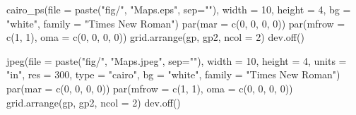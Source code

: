 \documentclass[
  letterpaper,
]{scrbook}
\newenvironment{Shaded}{\begin{snugshade}}{\end{snugshade}}
\newcommand{\AttributeTok}[1]{\textcolor[rgb]{0.40,0.45,0.13}{#1}}
\newcommand{\DecValTok}[1]{\textcolor[rgb]{0.68,0.00,0.00}{#1}}
\newcommand{\FunctionTok}[1]{\textcolor[rgb]{0.28,0.35,0.67}{#1}}
\newcommand{\NormalTok}[1]{\textcolor[rgb]{0.00,0.23,0.31}{#1}}
\newcommand{\StringTok}[1]{\textcolor[rgb]{0.13,0.47,0.30}{#1}}
\begin{document}
\begin{Shaded}
\begin{Highlighting}[]
\FunctionTok{cairo\_ps}\NormalTok{(}\AttributeTok{file =} \FunctionTok{paste}\NormalTok{(}\StringTok{"fig/"}\NormalTok{, }\StringTok{"Maps.eps"}\NormalTok{, }\AttributeTok{sep=}\StringTok{""}\NormalTok{), }\AttributeTok{width =} \DecValTok{10}\NormalTok{, }\AttributeTok{height =} \DecValTok{4}\NormalTok{, }
          \AttributeTok{bg =} \StringTok{"white"}\NormalTok{, }\AttributeTok{family =} \StringTok{"Times New Roman"}\NormalTok{)}
\FunctionTok{par}\NormalTok{(}\AttributeTok{mar =} \FunctionTok{c}\NormalTok{(}\DecValTok{0}\NormalTok{, }\DecValTok{0}\NormalTok{, }\DecValTok{0}\NormalTok{, }\DecValTok{0}\NormalTok{))}
\FunctionTok{par}\NormalTok{(}\AttributeTok{mfrow =} \FunctionTok{c}\NormalTok{(}\DecValTok{1}\NormalTok{, }\DecValTok{1}\NormalTok{), }\AttributeTok{oma =} \FunctionTok{c}\NormalTok{(}\DecValTok{0}\NormalTok{, }\DecValTok{0}\NormalTok{, }\DecValTok{0}\NormalTok{, }\DecValTok{0}\NormalTok{))}
\FunctionTok{grid.arrange}\NormalTok{(gp, gp2, }\AttributeTok{ncol =} \DecValTok{2}\NormalTok{)}
\FunctionTok{dev.off}\NormalTok{()}

\FunctionTok{jpeg}\NormalTok{(}\AttributeTok{file =} \FunctionTok{paste}\NormalTok{(}\StringTok{"fig/"}\NormalTok{, }\StringTok{"Maps.jpeg"}\NormalTok{, }\AttributeTok{sep=}\StringTok{""}\NormalTok{), }\AttributeTok{width =} \DecValTok{10}\NormalTok{, }\AttributeTok{height =} \DecValTok{4}\NormalTok{, }
    \AttributeTok{units =} \StringTok{"in"}\NormalTok{, }\AttributeTok{res =} \DecValTok{300}\NormalTok{, }\AttributeTok{type =} \StringTok{"cairo"}\NormalTok{,}
          \AttributeTok{bg =} \StringTok{"white"}\NormalTok{, }\AttributeTok{family =} \StringTok{"Times New Roman"}\NormalTok{)}
\FunctionTok{par}\NormalTok{(}\AttributeTok{mar =} \FunctionTok{c}\NormalTok{(}\DecValTok{0}\NormalTok{, }\DecValTok{0}\NormalTok{, }\DecValTok{0}\NormalTok{, }\DecValTok{0}\NormalTok{))}
\FunctionTok{par}\NormalTok{(}\AttributeTok{mfrow =} \FunctionTok{c}\NormalTok{(}\DecValTok{1}\NormalTok{, }\DecValTok{1}\NormalTok{), }\AttributeTok{oma =} \FunctionTok{c}\NormalTok{(}\DecValTok{0}\NormalTok{, }\DecValTok{0}\NormalTok{, }\DecValTok{0}\NormalTok{, }\DecValTok{0}\NormalTok{))}
\FunctionTok{grid.arrange}\NormalTok{(gp, gp2, }\AttributeTok{ncol =} \DecValTok{2}\NormalTok{)}
\FunctionTok{dev.off}\NormalTok{()}
\end{Highlighting}
\end{Shaded}
\end{document}
